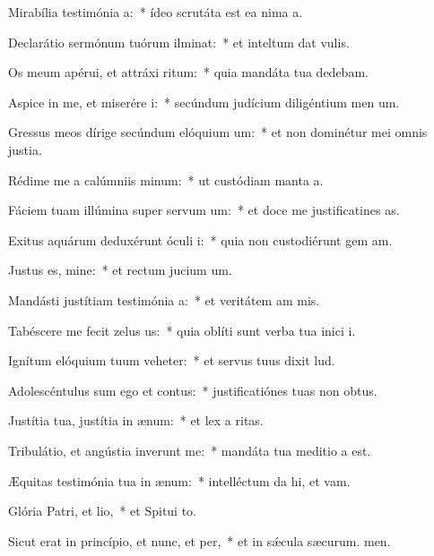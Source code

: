 \item Mirabília testimónia a:~* ídeo scrutáta est ea nima a.
\item Declarátio sermónum tuórum ilminat:~* et inteltum dat vulis.
\item Os meum apérui, et attráxi ritum:~* quia mandáta tua dedebam.
\item Aspice in me, et miserére i:~* secúndum judícium diligéntium men um.
\item Gressus meos dírige secúndum elóquium um:~* et non dominétur mei omnis justia.
\item Rédime me a calúmniis minum:~* ut custódiam manta a.
\item Fáciem tuam illúmina super servum um:~* et doce me justificatines as.
\item Exitus aquárum deduxérunt óculi i:~* quia non custodiérunt gem am.
\item Justus es, mine:~* et rectum jucium um.
\item Mandásti justítiam testimónia a:~* et veritátem am mis.
\item Tabéscere me fecit zelus us:~* quia oblíti sunt verba tua inici i.
\item Ignítum elóquium tuum veheter:~* et servus tuus dixit lud.
\item Adolescéntulus sum ego et contus:~* justificatiónes tuas non  obtus.
\item Justítia tua, justítia in ænum:~* et lex a ritas.
\item Tribulátio, et angústia inverunt me:~* mandáta tua meditio a est.
\item Æquitas testimónia tua in ænum:~* intelléctum da hi, et vam.
\item Glória Patri, et lio,~* et Spitui to.
\item Sicut erat in princípio, et nunc, et per,~* et in sǽcula sæcurum. men.
